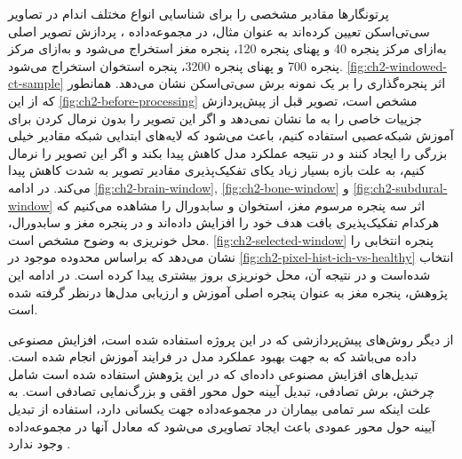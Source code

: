 پرتونگار‌ها مقادیر مشخصی را برای شناسایی انواع مختلف اندام در تصاویر سی‌تی‌اسکن تعیین کرده‌اند به عنوان مثال، در مجموعه‌داده
،
پردازش تصویر اصلی به‌ازای مرکز پنجره 40 و پهنای پنجره 120، پنجره مغز استخراج می‌شود و به‌ازای مرکز پنجره 700 و پهنای پنجره 3200،‌ پنجره استخوان استخراج می‌شود.
\autoref{fig:ch2-windowed-ct-sample}
اثر پنجره‌گذاری را بر یک نمونه برش سی‌تی‌اسکن نشان می‌دهد. همانطور که از این
\autoref{fig:ch2-before-processing}
 مشخص است، تصویر قبل از پیش‌پردازش جزییات خاصی را به ما نشان نمی‌دهد و اگر این تصویر را بدون نرمال کردن برای آموزش شبکه‌عصبی استفاده کنیم، باعث می‌شود که لایه‌های ابتدایی شبکه مقادیر خیلی بزرگی را ایجاد کنند و در نتیجه عملکرد مدل کاهش پیدا بکند و اگر این تصویر را نرمال کنیم، به علت بازه بسیار زیاد یکای 
تفکیک‌پذیری مقادیر تصویر به شدت کاهش پیدا می‌کند. در ادامه
\autoref{fig:ch2-brain-window}, \autoref{fig:ch2-bone-window} و \autoref{fig:ch2-subdural-window}
اثر سه پنجره مرسوم مغز، استخوان و سابدورال را مشاهده می‌کنیم که هرکدام تفکیک‌پذیری بافت هدف خود را افزایش داده‌اند و در پنجره مغز و سابدورال، محل خونریزی به وضوح مشخص است.
\autoref{fig:ch2-selected-window}
 پنجره انتخابی را نشان می‌دهد که براساس محدوده موجود در  
\autoref{fig:ch2-pixel-hist-ich-vs-healthy}
انتخاب شده‌است و در نتیجه آن، محل خونریزی بروز بیشتری پیدا کرده است. در ادامه این پژوهش،‌ پنجره مغز به عنوان پنجره اصلی آموزش و ارزیابی مدل‌ها درنظر گرفته شده است.

از دیگر روش‌های پیش‌پردازشی که در این پروژه استفاده شده است، افزایش مصنوعی داده می‌باشد که به جهت بهبود عملکرد مدل در فرایند آموزش انجام شده است. تبدیل‌های افزایش مصنوعی داده‌ای که در این پژوهش استفاده شده است شامل چرخش، برش تصادفی،‌ تبدیل آیینه حول محور افقی و‌ بزرگ‌نمایی تصادفی است. به علت اینکه سر تمامی بیماران در مجموعه‌داده 
جهت یکسانی دارد، استفاده از تبدیل آیینه حول محور عمودی باعث ایجاد تصاویری می‌شود که معادل آنها در مجموعه‌داده وجود ندارد
\cite{hssayeni2020intracranial}.



